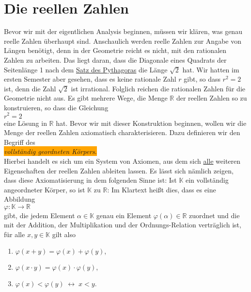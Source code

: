 \chapter{Die reellen Zahlen}
Bevor wir mit der eigentlichen Analysis beginnen,  müssen wir klären, was genau reelle Zahlen
überhaupt sind.  Anschaulich werden reelle Zahlen zur Angabe von Längen benötigt, denn in der Geometrie
reicht es nicht, mit den rationalen Zahlen zu arbeiten.  Das liegt daran, dass die Diagonale eines
Quadrats der Seitenlänge 1 nach dem 
\href{http://de.wikipedia.org/wiki/Satz_des_Pythagoras}{Satz des Pythagoras} die Länge $\sqrt{2}$ hat.
Wir hatten im ersten Semester aber gesehen, dass es keine rationale Zahl $r$ gibt,
so dass $r^2 = 2$ ist, denn die Zahl $\sqrt{2}$ ist irrational.  Folglich reichen die rationalen Zahlen für die Geometrie
nicht aus.  Es gibt mehrere Wege, die Menge $\mathbb{R}$ der reellen Zahlen so zu konstruieren, so dass die Gleichung 
\\[0.2cm]
\hspace*{1.3cm}
$r^2 = 2$
\\[0.2cm]
eine Lösung in $\mathbb{R}$ hat.  Bevor wir mit dieser Konstruktion beginnen, wollen wir die Menge
der reellen Zahlen axiomatisch charakterisieren.  Dazu definieren wir den Begriff des
\\[0.2cm]
\hspace*{1.3cm}
\colorbox{orange}{\emph{vollständig geordneten Körpers}.}
\\[0.2cm]
Hierbei handelt es sich um ein System von Axiomen, aus dem
sich \underline{alle} weiteren Eigenschaften der reellen Zahlen ableiten lassen.  Es lässt sich nämlich zeigen,
dass diese Axiomatisierung in dem folgenden Sinne  ist:
Ist $\mathbb{K}$ ein vollständig angeordneter Körper, so ist $\mathbb{K}$  zu
$\mathbb{R}$: Im Klartext heißt dies, dass es eine Abbildung
\\[0.2cm]
\hspace*{1.3cm}
$\varphi:\mathbb{K} \rightarrow \mathbb{R}$
\\[0.2cm]
gibt, die jedem Element $\alpha \in \mathbb{K}$ genau ein Element $\varphi(\alpha) \in \mathbb{R}$
zuordnet und die mit der Addition, der Multiplikation und der Ordnungs-Relation verträglich ist, für alle $x,y \in
\mathbb{K}$ gilt also 
\begin{enumerate}
\item $\varphi(x + y) = \varphi(x) + \varphi(y)$,
\item $\varphi(x \cdot y) = \varphi(x) \cdot \varphi(y)$,
\item $\varphi(x) < \varphi(y) \;\leftrightarrow\; x < y$.
\end{enumerate}

